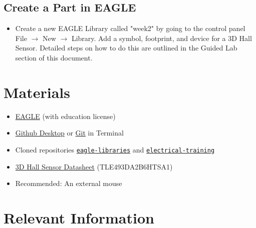 \documentclass{article}
\begin{document}
\subsection{Create a Part in EAGLE}
\begin{itemize}
    \item Create a new EAGLE Library called "week2" by going to the control panel File $\rightarrow$ New $\rightarrow$ Library. Add a symbol, footprint, and device for a 3D Hall Sensor. Detailed steps on how to do this are outlined in the Guided Lab section of this document.
\end{itemize}


\section{Materials}
\begin{itemize}
	\item \href{https://www.autodesk.com/education/free-software/eagle}{EAGLE} (with education license)
	\item \href{https://docs.github.com/en/desktop/getting-started-with-github-desktop/installing-github-desktop}{Github Desktop} or \href{https://git-scm.com/book/en/v2/Getting-Started-Installing-Git}{Git} in Terminal
	\item Cloned repositories \href{https://github.com/RoboJackets/eagle-libraries}{\texttt{eagle-libraries}} and \href{https://github.com/RoboJackets/electrical-training/tree/master}{\texttt{electrical-training}}
	\item \href{https://media.digikey.com/pdf/Data%20Sheets/Infineon%20PDFs/TLE493D-A2B6_V1.3_4-9-19.pdf}{3D Hall Sensor Datasheet} (TLE493DA2B6HTSA1)
	\item Recommended: An external mouse
\end{itemize}

\section{Relevant Information}
\end{document}
